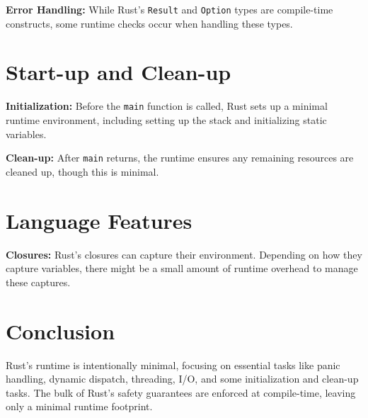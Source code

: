 \documentclass{article}
\begin{document}
\textbf{Error Handling:} While Rust’s \texttt{Result} and \texttt{Option} types are compile-time constructs, some runtime checks occur when handling these types.

\section{Start-up and Clean-up}
\textbf{Initialization:} Before the \texttt{main} function is called, Rust sets up a minimal runtime environment, including setting up the stack and initializing static variables.

\textbf{Clean-up:} After \texttt{main} returns, the runtime ensures any remaining resources are cleaned up, though this is minimal.

\section{Language Features}
\textbf{Closures:} Rust’s closures can capture their environment. Depending on how they capture variables, there might be a small amount of runtime overhead to manage these captures.

\section{Conclusion}
Rust's runtime is intentionally minimal, focusing on essential tasks like panic handling, dynamic dispatch, threading, I/O, and some initialization and clean-up tasks. The bulk of Rust’s safety guarantees are enforced at compile-time, leaving only a minimal runtime footprint.
\end{document}
